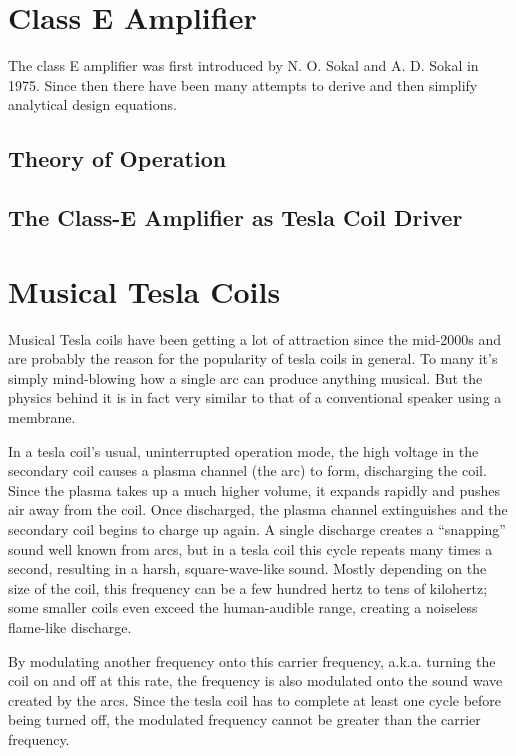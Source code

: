 \section{Class E Amplifier}
The class E amplifier was first introduced by N. O. Sokal and A. D. Sokal in 1975. Since then there have been many attempts to derive  and then simplify analytical design equations.

\subsection{Theory of Operation}

\subsection{The Class-E Amplifier as Tesla Coil Driver}

\section{Musical Tesla Coils}

Musical Tesla coils have been getting a lot of attraction since the mid-2000s and are probably the reason for the popularity of tesla coils in general. To many it's simply mind-blowing how a single arc can produce anything musical. But the physics behind it is in fact very similar to that of a conventional speaker using a membrane.

In a tesla coil's usual, uninterrupted operation mode, the high voltage in the secondary coil causes a plasma channel (the arc) to form, discharging the coil. Since the plasma takes up a much higher volume, it expands rapidly and pushes air away from the coil. Once discharged, the plasma channel extinguishes and the secondary coil begins to charge up again. A single discharge creates a \enquote{snapping} sound well known from arcs, but in a tesla coil this cycle repeats many times a second, resulting in a harsh, square-wave-like sound. Mostly depending on the size of the coil, this frequency can be a few hundred hertz to tens of kilohertz; some smaller coils even exceed the human-audible range, creating a noiseless flame-like discharge.

By modulating another frequency onto this carrier frequency, a.k.a. turning the coil on and off at this rate, the frequency is also modulated onto the sound wave created by the arcs. Since the tesla coil has to complete at least one cycle before being turned off, the modulated frequency cannot be greater than the carrier frequency. 

